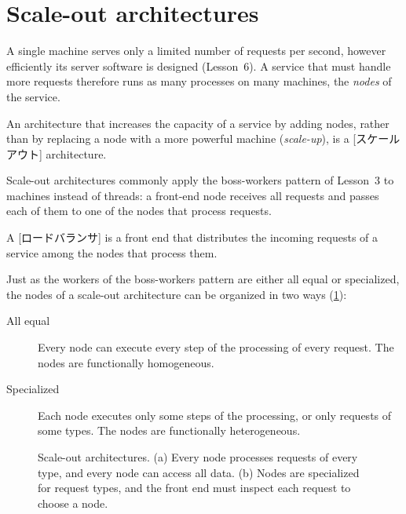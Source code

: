\documentclass[../main.tex]{subfiles}
\begin{document}
\section{Scale-out architectures}
\label{sec:l16-scaleout}

A single machine serves only a limited number of requests per second,
however efficiently its server software is designed (Lesson~6).  A service that must handle more requests therefore runs as
many processes on many machines, the \emph{nodes} of the service.

\begin{definition}
  An architecture that increases the capacity of a service by adding nodes,
  rather than by replacing a node with a more powerful machine
  (\emph{scale-up}), is a [スケールアウト] architecture.
\end{definition}

Scale-out architectures commonly apply the boss-workers
pattern of Lesson~3 to machines instead of
threads: a front-end node receives all requests and passes each of them to
one of the nodes that process requests.

\begin{definition}
  A [ロードバランサ] is a front end that distributes the
  incoming requests of a service among the nodes that process
  them.
\end{definition}

Just as the workers of the boss-workers pattern are either all equal or
specialized, the nodes of a scale-out architecture can be organized in two
ways (\cref{fig:l16-scaleout}):
\begin{description}
  \item[All equal] Every node can execute every step of the processing of
    every request.  The nodes are functionally homogeneous.
  \item[Specialized] Each node executes only some steps of the processing,
    or only requests of some types.  The nodes are functionally
    heterogeneous.
\end{description}

\begin{figure}[htbp]
  \centering
  
  \caption{Scale-out architectures.  (a) Every node processes requests of
    every type, and every node can access all data.  (b) Nodes are
    specialized for request types, and the front end must inspect each
    request to choose a node.}
  \label{fig:l16-scaleout}
\end{figure}
\end{document}
